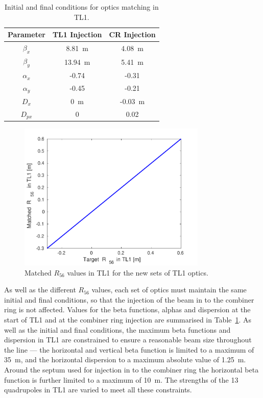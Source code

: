 \begin{table}
  \begin{center}
    \begin{tabular}{| c c c |}
	   \hline
       Parameter & TL1 Injection & CR Injection \\ \hline
       \(\beta_x\) & 8.81~m & 4.08~m \\
       \(\beta_y\) & 13.94~m & 5.41~m \\
       \(\alpha_x\) & -0.74 & -0.31 \\
       \(\alpha_y\) & -0.45 & -0.21 \\ 
       \(D_x\) & 0~m & -0.03~m \\ 
       \(D_{px}\) & 0 & 0.02 \\ \hline
    \end{tabular}
    \caption{Initial and final conditions for optics matching in TL1.}
  	\label{t:tl1MatchParams}
  \end{center}
\end{table}
\begin{figure}
  \centering
  \includegraphics[width=0.8\textwidth]{Figures/propagation/r56MatchedVsTarget}
  \caption{Matched \(R_{56}\) values in TL1 for the new sets of TL1 optics.}
  \label{f:r56MatchedVsTarget}
\end{figure}




As well as the different \(R_{56}\) values, each set of optics must maintain the same initial and final conditions, so that the injection of the beam in to the combiner ring is not affected. Values for the beta functions, alphas and dispersion at the start of TL1 and at the combiner ring injection are summarised in Table~\ref{t:tl1MatchParams}. As well as the initial and final conditions, the maximum beta functions and dispersion in TL1 are constrained to ensure a reasonable beam size throughout the line --- the horizontal and vertical beta function is limited to a maximum of 35~m, and the horizontal dispersion to a maximum absolute value of 1.25~m. Around the septum used for injection in to the combiner ring the horizontal beta function is further limited to a maximum of 10~m. The strengths of the 13 quadrupoles in TL1 are varied to meet all these constraints.


